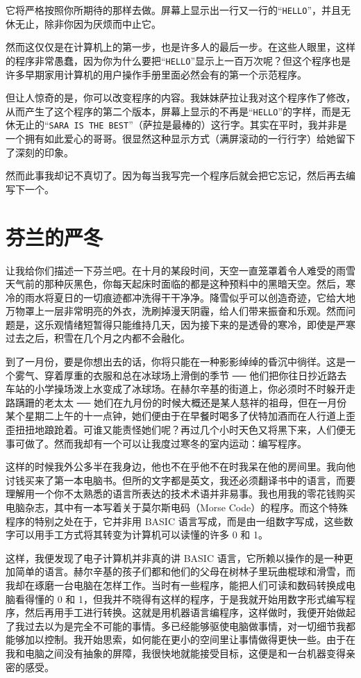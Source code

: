 它将严格按照你所期待的那样去做。屏幕上显示出一行又一行的“\verb|HELLO|”，并且无休无止，除非你因为厌烦而中止它。

然而这仅仅是在计算机上的第一步，也是许多人的最后一步。在这些人眼里，这样的程序非常愚蠢，因为你为什么要把“\verb|HELLO|”显示上一百万次呢？但这个程序也是许多早期家用计算机的用户操作手册里面必然会有的第一个示范程序。

但让人惊奇的是，你可以改变程序的内容。我妹妹萨拉让我对这个程序作了修改，从而产生了这个程序的第二个版本，屏幕上显示的不再是“\verb|HELLO|”的字样，而是无休无止的“\verb|SARA IS THE BEST|”（萨拉是最棒的）这行字。其实在平时，我并非是一个拥有如此爱心的哥哥。很显然这种显示方式（满屏滚动的一行行字）给她留下了深刻的印象。

然而此事我却记不真切了。因为每当我写完一个程序后就会把它忘记，然后再去编写下一个。

 
\section{芬兰的严冬}

让我给你们描述一下芬兰吧。在十月的某段时间，天空一直笼罩着令人难受的雨雪天气前的那种灰黑色，你每天起床时面临的都是这种预料中的黑暗天空。然后，寒冷的雨水将夏日的一切痕迹都冲洗得干干净净。降雪似乎可以创造奇迹，它给大地万物罩上一层非常明亮的外衣，洗刷掉漫天阴霾，给人们带来振奋和乐观。然而问题是，这乐观情绪短暂得只能维持几天，因为接下来的是透骨的寒冷，即使是严寒过去之后，积雪在几个月之内都不会融化。

到了一月份，要是你想出去的话，你将只能在一种影影绰绰的昏沉中徜徉。这是一个雾气、穿着厚重的衣服和总在冰球场上滑倒的季节 ── 他们把你往日抄近路去车站的小学操场泼上水变成了冰球场。在赫尔辛基的街道上，你必须时不时躲开走路蹒跚的老太太 ── 她们在九月份的时候大概还是某人慈祥的祖母，但在一月份某个星期二上午的十一点钟，她们便由于在早餐时喝多了伏特加酒而在人行道上歪歪扭扭地踉跄着。可谁又能责怪她们呢？再过几个小时天色又将黑下来，人们便无事可做了。然而我却有一个可以让我度过寒冬的室内运动：编写程序。

这样的时候我外公多半在我身边，他也不在乎他不在时我呆在他的房间里。我向他讨钱买来了第一本电脑书。但所的文字都是英文，我还必须翻译书中的语言，而要理解用一个你不太熟悉的语言所表达的技术术语并非易事。我也用我的零花钱购买电脑杂志，其中有一本写着关于莫尔斯电码（Morse Code）的程序。而这个特殊程序的特别之处在于，它并非用 BASIC 语言写成，而是由一组数字写成，这些数字可以用手工方式将其转变为计算机可以读懂的许多 0 和 1。

这样，我便发现了电子计算机并非真的讲 BASIC 语言，它所赖以操作的是一种更加简单的语言。赫尔辛基的孩子们都和他们的父母在树林子里玩曲棍球和滑雪，而我却在琢磨一台电脑在怎样工作。当时有一些程序，能把人们可读和数码转换成电脑看得懂的 0 和 1，但我并不晓得有这样的程序，于是我就开始用数字形式编写程序，然后再用手工进行转换。这就是用机器语言编程序，这样做时，我便开始做起了我过去以为是完全不可能的事情。多已经能够驱使电脑做事情，对一切细节我都能够加以控制。我开始思索，如何能在更小的空间里让事情做得更快一些。由于在我和电脑之间没有抽象的屏障，我很快地就能接受目标，这便是和一台机器变得亲密的感受。

